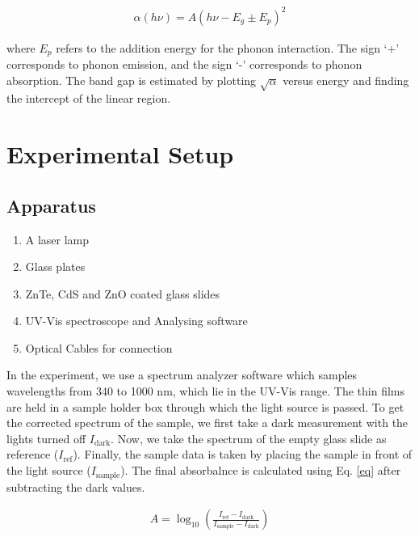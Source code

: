 \begin{align}
    \alpha(h\nu) = A(h\nu - E_g \pm E_p)^{2}
\end{align}

where $E_p$ refers to the addition energy for the phonon interaction. The sign `+' corresponds to phonon emission, and the sign `-' corresponds to phonon absorption. The band gap is estimated by plotting $\sqrt{\alpha}$ versus energy and finding the intercept of the linear region.

\section{Experimental Setup}

\subsection*{Apparatus}

\begin{enumerate}
    \item A laser lamp
    \item Glass plates
    \item ZnTe, CdS and ZnO coated glass slides
    \item UV-Vis spectroscope and Analysing software
    \item Optical Cables for connection\\
\end{enumerate}

In the experiment, we use a spectrum analyzer software which samples wavelengths from 340 to 1000 nm, which lie in the UV-Vis range. The thin films are held in a sample holder box  through which the light source is passed. To get the corrected spectrum of the sample, we first take a dark measurement with the lights turned off $I_\text{dark}$. Now, we take the spectrum of the empty glass slide as reference ($I_\text{ref}$). Finally, the sample data is taken by placing the sample in front of the light source ($I_\text{sample}$). The final absorbalnce is calculated using Eq. \ref{eq} after subtracting the dark values.

\begin{align}
    A = \log_{10} \left(\frac{I_\text{ref}-I_\text{dark}}{I_\text{sample}-I_\text{dark}}\right)
\end{align}